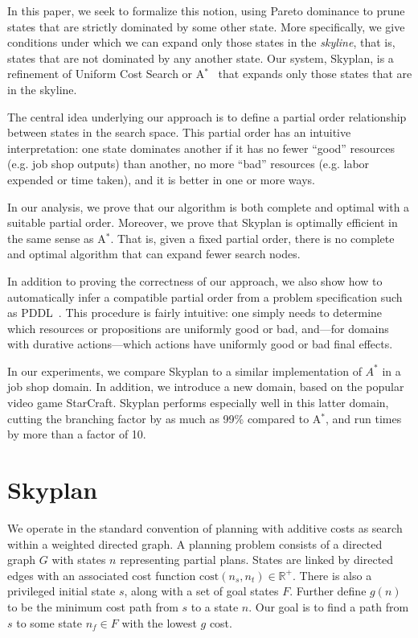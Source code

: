\documentclass[letterpaper]{article}
\theoremstyle{plain} \newtheorem{theorem}{Theorem} \newtheorem{proposition}{Proposition} \newtheorem{lemma}{Lemma}
\theoremstyle{definition} \newtheorem{definition}{Definition} \newtheorem{conjecture}{Conjecture} \newtheorem*{example}{Example}
\theoremstyle{remark} \newtheorem*{remark}{Remark} \newtheorem*{note}{Note} \newtheorem{case}{Case}
\newcommand{\Astar}{A$^*$}
\begin{document}
In this paper, we seek to formalize this notion, using Pareto
dominance to prune states that are strictly dominated by some other
state. More specifically, we give conditions under which we can
expand only those states in the \textit{skyline}, that is, states
that are not dominated by any another state. Our system, Skyplan,
is a refinement of Uniform Cost Search or \Astar~\citep{astar} that
expands only those states that are in the skyline.

The central idea underlying our approach is to define a partial
order relationship between states in the search space. This partial
order has an intuitive interpretation: one state dominates another
if it has no fewer ``good'' resources (e.g. job shop outputs) than
another, no more ``bad'' resources (e.g. labor expended or time
taken), and it is better in one or more ways. 

In our analysis, we prove that our algorithm is both complete and
optimal with a suitable partial order. Moreover, we prove that
Skyplan is optimally efficient in the same sense as \Astar. That
is, given a fixed partial order, there is no complete and optimal
algorithm that can expand fewer search nodes.

In addition to proving the correctness of our approach, we also
show how to automatically infer a compatible partial order from a problem
specification such as PDDL~\citep{ghallab1998pddl,fox2003pddl2}.
This procedure is fairly intuitive: one simply needs to determine
which resources or propositions are uniformly good or bad, and---for 
domains with durative actions---which actions have uniformly
good or bad final effects.

In our experiments, we compare Skyplan to a similar implementation
of $A^*$ in a job shop domain. In addition, we introduce a new
domain, based on the popular video game StarCraft. Skyplan performs
especially well in this latter domain, cutting the branching factor
by as much as 99\% compared to \Astar, and run times by more
than a factor of 10.

\section{Skyplan}


We operate in the standard convention of planning with additive
costs as search within a weighted directed graph.  A planning problem
consists of a directed graph $G$ with states $n$ representing
partial plans. States are linked by directed edges with an associated
cost function $\mathrm{cost}(n_s,n_t) \in \mathbb R^+$.  There is
also a privileged initial state $s$, along with a set of goal states
$F$.  Further define $g(n)$ to be the minimum cost path from $s$
to a state $n$.  Our goal is to find a path from $s$ to some state
$n_f \in F$ with the lowest $g$ cost.
\end{document}
